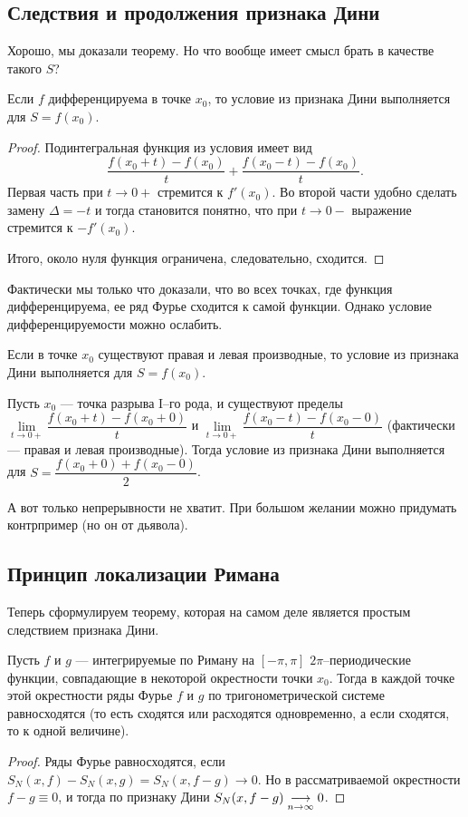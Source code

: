 \subsection{Следствия и продолжения признака Дини}
Хорошо, мы доказали теорему. Но что вообще имеет смысл брать в качестве такого $S$?
\begin{Comment}
Если $f$ дифференцируема в точке $x_0$, то условие из признака Дини выполняется для $S = f(x_0)$.
\end{Comment}
\begin{proof}
Подинтегральная функция из условия имеет вид 
$$
\dfrac{f(x_0 + t) - f(x_0)}{t} + \dfrac{f(x_0 - t) - f(x_0)}{t}.
$$
Первая часть при $t \to 0+$ стремится к $f'(x_0)$. Во второй части удобно сделать замену $\Delta = -t$ и тогда становится понятно, что при $t \to 0-$ выражение стремится к $-f'(x_0)$.

Итого, около нуля функция ограничена, следовательно, сходится.
\end{proof}

Фактически мы только что доказали, что во всех точках, где функция дифференцируема, ее ряд Фурье сходится к самой функции. Однако условие дифференцируемости можно ослабить.
\begin{Comment}
Если в точке $x_0$ существуют правая и левая производные, то условие из признака Дини выполняется для $S = f(x_0)$.
\end{Comment}
\begin{Comment}
Пусть $x_0$ --- точка разрыва I--го рода, и существуют пределы $\lim\limits_{t \to 0+}\dfrac{f(x_0 + t) - f(x_0 + 0)}{t}$ и $\lim\limits_{t \to 0+} \dfrac{f(x_0-t) - f(x_0 - 0)}{t}$ (фактически --- правая и левая производные). Тогда условие из признака Дини выполняется для $S = \dfrac{f(x_0 + 0) + f(x_0 - 0)}{2}$.
\end{Comment}
А вот только непрерывности не хватит. При большом желании можно придумать контрпример (но он от дьявола).

\subsection{Принцип локализации Римана}
Теперь сформулируем теорему, которая на самом деле является простым следствием признака Дини.

\begin{Theorem}
Пусть $f$ и $g$ --- интегрируемые по Риману на $[-\pi, \pi]$ $2\pi$--периодические функции, совпадающие в некоторой окрестности точки $x_0$. Тогда в каждой точке этой окрестности ряды Фурье $f$ и $g$ по тригонометрической системе равносходятся (то есть сходятся или расходятся одновременно, а если сходятся, то к одной величине).
\end{Theorem}
\begin{proof}
Ряды Фурье равносходятся, если $S_N(x, f) - S_N(x, g) = S_N(x, f - g) \to 0$. Но в рассматриваемой окрестности $f - g \equiv 0$, и тогда по признаку Дини $S_N(x, f - g) \underset{n\to \infty}{\longrightarrow} 0$.
\end{proof}

